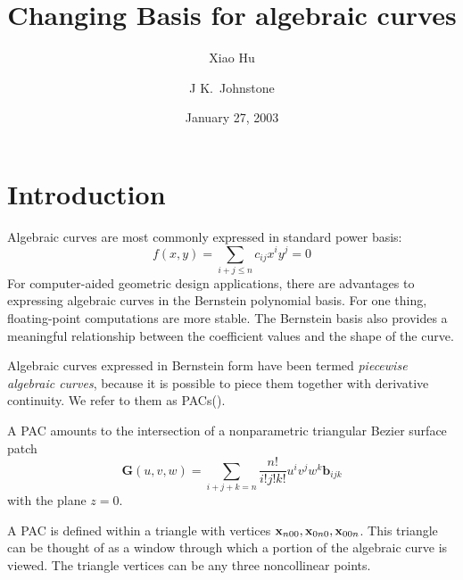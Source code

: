 \documentclass[reqno]{amsart}
\theoremstyle{plain}
\begin{document}
\title{Changing Basis for algebraic curves}
\author{Xiao Hu}
\author{J K.~Johnstone}
\address{Computer Science Department\\
	 University of Alabama at Birmingham\\
	 Birmingham, AL, 35255}

\date{January 27, 2003}
\maketitle




\section{Introduction}
 Algebraic curves are most commonly expressed in standard power
 basis:
 \begin{equation}\label{n1}
 f(x,y) = \sum_{i+j \leq n}c_{ij}x^{i}y^{j} = 0
 \end{equation}
 For computer-aided geometric design applications, there are
 advantages to expressing algebraic curves in the Bernstein
 polynomial basis. For one thing, floating-point computations are
 more stable.  The Bernstein basis also provides a meaningful
 relationship between the coefficient values and the shape of the
 curve.

Algebraic curves expressed in Bernstein form have been termed
 \emph{piecewise algebraic curves}, because it is possible to
 piece them together with derivative continuity. We refer to them
 as \textrm{PAC}s(\cite{h1}).

 A PAC amounts to the intersection of a nonparametric triangular Bezier 
 surface patch 
 \[
    \mathbf{G}(u,v,w) = \sum_{i+j+k=n}\frac{n!}{i!j!k!}u^{i}v^{j}w^{k}\mathbf{b}_{ijk}
 \]
 with the plane $z=0$.

 A PAC is defined within a triangle with vertices
 $\bold{x}_{n00},\bold{x}_{0n0},\bold{x}_{00n}$.  This triangle
 can be thought of as a window through which a portion of the
 algebraic curve is viewed.  The triangle vertices can be any
 three noncollinear points.
\end{document}
